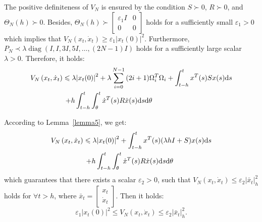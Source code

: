 \documentclass[a4paper]{cas-sc}
\begin{document}
The positive definiteness of $V_N$ is ensured by the condition $S \succ 0$, $R \succ 0$, and ${\Theta _N}(h) \succ 0$. Besides, ${\Theta _N}(h) \succ \left[ {\begin{array}{*{20}{c}}
          {{\varepsilon_1}I} & 0 \\
          0                  & 0
        \end{array}} \right]$ holds for a sufficiently small ${\varepsilon _1} > 0$ which implies that ${V_N}\left( {{x_t},{{\dot x}_t}} \right) \geqslant {\varepsilon _1}{\left| {{x_t}(0)} \right|^2}$. Furthermore, ${P_N} \prec \lambda \operatorname{diag} (I,I,3I,5I, \ldots ,(2N - 1)I)$ holds for a sufficiently large scalar $\lambda  > 0$. Therefore, it holds:
\begin{equation}
  \begin{gathered}
    {V_N}\left( {{x_t},{{\dot x}_t}} \right) \leqslant \lambda {\left| {{x_t}(0)} \right|^2} + \lambda \sum\limits_{i = 0}^{N - 1} {(2i + 1)} \Omega _i^T{\Omega _i} + \int_{t - h}^t {{x^T}} (s)Sx(s){\text{d}}s \hfill \\
    \quad \quad \quad \quad \quad  + h\int_{t - h}^t {\int_\theta ^t {{{\dot x}^T}(s)R\dot x(s){\text{d}}s{\text{d}}\theta } }  \hfill \\
  \end{gathered}
  \label{D4}
\end{equation}

According to Lemma~\ref{lemma5}, we get:
\begin{equation}
  \begin{gathered}
    {V_N}\left( {{x_t},{{\dot x}_t}} \right) \leqslant \lambda {\left| {{x_t}(0)} \right|^2} + \int_{t - h}^t {{x^T}(s)(\lambda hI + S)x(s){\text{d}}s}  \hfill \\
    \quad \quad \quad \quad \quad  + h\int_{t - h}^t {\int_\theta ^t {{{\dot x}^T}(s)R\dot x(s){\text{d}}s{\text{d}}\theta } }  \hfill \\
  \end{gathered}
  \label{D5}
\end{equation}
which guarantees that there exists a scalar ${\varepsilon _2} > 0$, such that ${V_N}\left( {{x_t},{{\dot x}_t}} \right) \leqslant {\varepsilon _2}\left| {{{\bar x}_t}} \right|_h^2$ holds for $\forall t > h$, where ${\bar x_t} = \left[ {\begin{array}{*{20}{c}}
          {{x_t}} \\
          {{{\dot x}_t}}
        \end{array}} \right]$. Then it holds:
\begin{equation}
  {\varepsilon _1}{\left| {{x_t}(0)} \right|^2} \leqslant {V_N}\left( {{x_t},{{\dot x}_t}} \right) \leqslant {\varepsilon _2}\left| {{{\bar x}_t}} \right|_h^2.
  \label{D6}
\end{equation}
\end{document}
